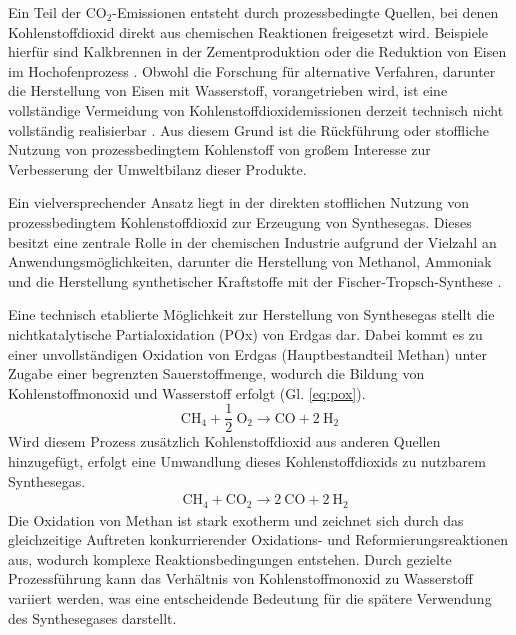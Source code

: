     Ein Teil der CO$_2$-Emissionen entsteht durch prozessbedingte Quellen, bei denen Kohlenstoffdioxid direkt aus chemischen Reaktionen freigesetzt wird. Beispiele hierfür sind Kalkbrennen in der Zementproduktion oder die Reduktion von Eisen im Hochofenprozess \parencite{hasanbeigi_springer_2019_steel, MASSOUMINEJAD2025100251}. Obwohl die Forschung für alternative Verfahren, darunter die Herstellung von Eisen mit Wasserstoff, vorangetrieben wird, ist eine vollständige Vermeidung von Kohlenstoffdioxidemissionen derzeit technisch nicht vollständig realisierbar \cite{DELLAROCCA2025100312}. Aus diesem Grund ist die Rückführung oder stoffliche Nutzung von prozessbedingtem Kohlenstoff von großem Interesse zur Verbesserung der Umweltbilanz dieser Produkte. 

    Ein vielversprechender Ansatz liegt in der direkten stofflichen Nutzung von prozessbedingtem Kohlenstoffdioxid zur Erzeugung von Synthesegas. Dieses besitzt eine zentrale Rolle in der chemischen Industrie aufgrund der Vielzahl an Anwendungsmöglichkeiten, darunter die Herstellung von Methanol, Ammoniak und die Herstellung synthetischer Kraftstoffe mit der Fischer-Tropsch-Synthese \cite{CENTI20204}. 

    Eine technisch etablierte Möglichkeit zur Herstellung von Synthesegas stellt die nichtkatalytische Partialoxidation (POx) von Erdgas dar. Dabei kommt es zu einer unvollständigen Oxidation von Erdgas (Hauptbestandteil Methan) unter Zugabe einer begrenzten Sauerstoffmenge, wodurch die Bildung von Kohlenstoffmonoxid und Wasserstoff erfolgt (Gl. \ref{eq:pox}).
    \begin{equation}
    \label{eq:pox}
    \mathrm{CH_4 + \frac{1}{2}\ O_2 \longrightarrow CO + 2\ H_2}
    \end{equation}
    Wird diesem Prozess zusätzlich Kohlenstoffdioxid aus anderen Quellen hinzugefügt, erfolgt eine Umwandlung dieses Kohlenstoffdioxids zu nutzbarem Synthesegas.
    \begin{align}
        &\mathrm{CH_4 + CO_2 \longrightarrow 2\ CO + 2\  H_2} \label{eq:dampfreformierung_einleitung}
    \end{align}
    Die Oxidation von Methan ist stark exotherm und zeichnet sich durch das gleichzeitige Auftreten konkurrierender Oxidations- und Reformierungsreaktionen aus, wodurch komplexe Reaktionsbedingungen entstehen. Durch gezielte Prozessführung kann das Verhältnis von Kohlenstoffmonoxid zu Wasserstoff variiert werden, was eine entscheidende Bedeutung für die spätere Verwendung des Synthesegases darstellt. 


